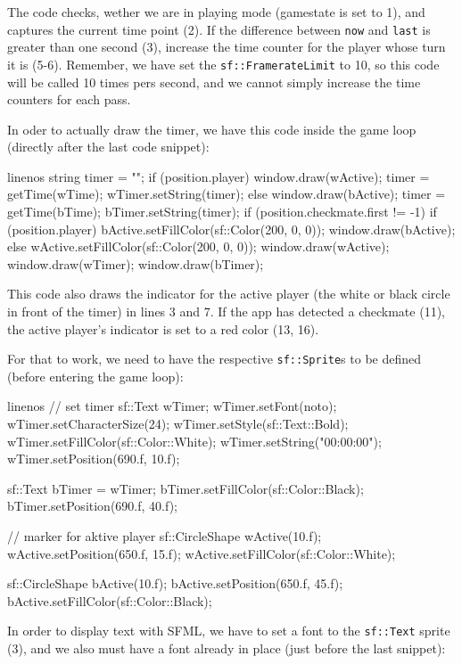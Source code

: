 The code checks, wether we are in playing mode (gamestate is set to 1), and captures the current
time point (2).
If the difference between \texttt{now} and \texttt{last} is greater than one second (3), increase
the time counter for the player whose turn it is (5-6).
Remember, we have set the \texttt{sf::FramerateLimit} to 10, so this code will be called 10 times
pers second, and we cannot simply increase the time counters for each pass.

In oder to actually draw the timer, we have this code inside the game loop (directly after the
last code snippet):

\begin{cpp*}{linenos}
string timer = "";
if (position.player) {
  window.draw(wActive);
  timer = getTime(wTime);
  wTimer.setString(timer);
} else {
  window.draw(bActive);
  timer = getTime(bTime);
  bTimer.setString(timer);
}
if (position.checkmate.first != -1) {
  if (position.player) {
    bActive.setFillColor(sf::Color(200, 0, 0));
    window.draw(bActive);
  } else {
    wActive.setFillColor(sf::Color(200, 0, 0));
    window.draw(wActive);
  }
}
window.draw(wTimer);
window.draw(bTimer);
\end{cpp*}

This code also draws the indicator for the active player (the white or black circle in front of
the timer) in lines 3 and 7.
If the app has detected a checkmate (11), the active player's indicator is set to a red color (13, 16).

For that to work, we need to have the respective \texttt{sf::Sprite}s to be defined (before
entering the game loop):

\begin{cpp*}{linenos}
// set timer
sf::Text wTimer;
wTimer.setFont(noto);
wTimer.setCharacterSize(24);
wTimer.setStyle(sf::Text::Bold);
wTimer.setFillColor(sf::Color::White);
wTimer.setString("00:00:00");
wTimer.setPosition(690.f, 10.f);

sf::Text bTimer = wTimer;
bTimer.setFillColor(sf::Color::Black);
bTimer.setPosition(690.f, 40.f);

// marker for aktive player
sf::CircleShape wActive(10.f);
wActive.setPosition(650.f, 15.f);
wActive.setFillColor(sf::Color::White);

sf::CircleShape bActive(10.f);
bActive.setPosition(650.f, 45.f);
bActive.setFillColor(sf::Color::Black);
\end{cpp*}

In order to display text with SFML, we have to set a font to the \texttt{sf::Text} sprite (3),
and we also must have a font already in place (just before the last snippet):

